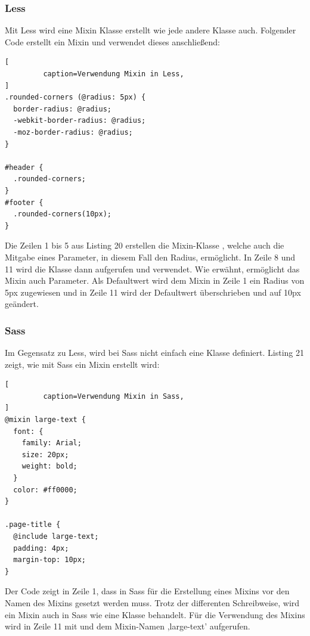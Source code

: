 \subsubsection{Less}
Mit Less wird eine Mixin Klasse erstellt wie jede andere Klasse auch. Folgender Code erstellt ein Mixin und verwendet dieses anschließend:
\begin{lstlisting}[
         caption=Verwendung Mixin in Less,
]
.rounded-corners (@radius: 5px) {
  border-radius: @radius;
  -webkit-border-radius: @radius;
  -moz-border-radius: @radius;
}

#header {
  .rounded-corners;
}
#footer {
  .rounded-corners(10px);
}
\end{lstlisting}\autocite[]{Sellier.2013}
Die Zeilen 1 bis 5 aus Listing 20 erstellen die Mixin-Klasse \glqq{}, welche auch die Mitgabe eines Parameter, in diesem Fall den Radius, ermöglicht. \newline
In Zeile 8 und 11 wird die Klasse dann aufgerufen und verwendet. Wie erwähnt, ermöglicht das Mixin auch Parameter. Als Defaultwert wird dem Mixin in Zeile 1 ein Radius von 5px zugewiesen und in Zeile 11 wird der Defaultwert überschrieben und auf 10px geändert.
\subsubsection{Sass}
Im Gegensatz zu Less, wird bei Sass nicht einfach eine Klasse definiert. Listing 21 zeigt, wie mit Sass ein Mixin erstellt wird:\newpage
\begin{lstlisting}[
         caption=Verwendung Mixin in Sass,
]
@mixin large-text {
  font: {
    family: Arial;
    size: 20px;
    weight: bold;
  }
  color: #ff0000;
}

.page-title {
  @include large-text;
  padding: 4px;
  margin-top: 10px;
}
\end{lstlisting}\autocite[]{Yard.2014}
Der Code zeigt in Zeile 1, dass in Sass für die Erstellung eines Mixins \glqq{} vor den Namen des Mixins gesetzt werden muss. Trotz der differenten Schreibweise, wird ein Mixin auch in Sass wie eine Klasse behandelt. \newline
Für die Verwendung des Mixins wird in Zeile 11 mit \glqq{} und dem Mixin-Namen ,large-text' aufgerufen. 
